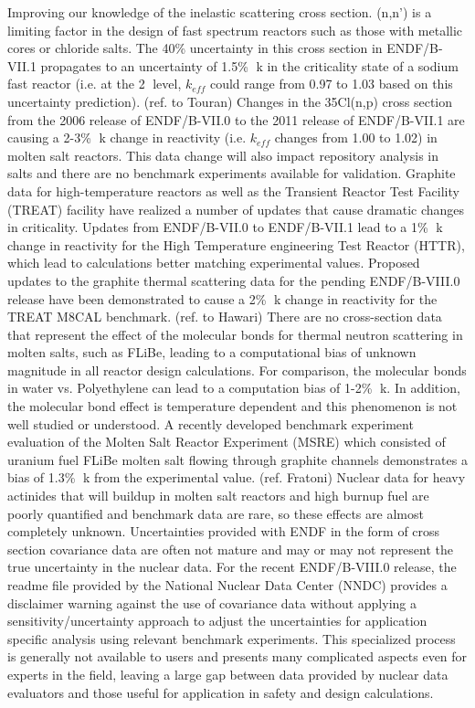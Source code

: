 \documentclass[letterpaper,draft]{ar-1col}
\begin{document}
Improving our knowledge of the  inelastic scattering cross section.   (n,n') is a limiting factor in the design of fast spectrum reactors such as those with metallic cores or chloride salts. The 40\% uncertainty in  this cross section in ENDF/B-VII.1 propagates to an uncertainty of 1.5\% k in the criticality state of a sodium fast reactor (i.e. at the 2 level, $k_{eff}$ could range from 0.97 to 1.03 based on this uncertainty prediction).  (ref. to Touran)
Changes in the 35Cl(n,p) cross section from the 2006 release of ENDF/B-VII.0 to the 2011 release of ENDF/B-VII.1 are causing a 2-3\% k change in reactivity (i.e. $k_{eff}$ changes from 1.00 to 1.02) in molten salt reactors. This data change will also impact repository analysis in salts and there are no benchmark experiments available for validation.
Graphite data for high-temperature reactors as well as the Transient Reactor Test Facility (TREAT) facility have realized a number of updates that cause dramatic changes in criticality. Updates from ENDF/B-VII.0 to ENDF/B-VII.1 lead to a 1\% k change in reactivity for the High Temperature engineering Test Reactor (HTTR), which lead to calculations better matching experimental values. Proposed updates to the graphite thermal scattering data for the pending ENDF/B-VIII.0 release have been demonstrated to cause a 2\% k change in reactivity for the TREAT M8CAL benchmark. (ref. to Hawari)
There are no cross-section data that represent the effect of the molecular bonds for thermal neutron scattering in molten salts, such as FLiBe, leading to a computational bias of unknown magnitude in all reactor design calculations. For comparison, the molecular bonds in water vs. Polyethylene can lead to a computation bias of 1-2\% k.  In addition, the molecular bond effect is temperature dependent and this phenomenon is not well studied or understood. A recently developed benchmark experiment evaluation of the Molten Salt Reactor Experiment (MSRE) which consisted of uranium fuel FLiBe molten salt flowing through graphite channels demonstrates a bias of 1.3\% k from the experimental value. (ref. Fratoni)
Nuclear data for heavy actinides that will buildup in molten salt reactors and high burnup fuel are poorly quantified and benchmark data are rare, so these effects are almost completely unknown.
Uncertainties provided with ENDF in the form of cross section covariance data are often not mature and may or may not represent the true uncertainty in the nuclear data. For the recent ENDF/B-VIII.0 release, the readme file provided by the National Nuclear Data Center (NNDC) provides a disclaimer warning against the use of covariance data without applying a sensitivity/uncertainty approach to adjust the uncertainties for application specific analysis using relevant benchmark experiments. This specialized process is generally not available to users and presents many complicated aspects even for experts in the field, leaving a large gap between data provided by nuclear data evaluators and those useful for application in safety and design calculations.
\end{document}
